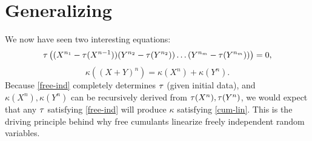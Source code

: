 \section{Generalizing}
We now have seen two interesting equations:
\begin{equation}
    \label{free-ind}
    \tau\left( (X^{n_1} - \tau(X^{n-1})) (Y^{n_2} - \tau(Y^{n_2}))\dots (Y^{n_m} - \tau(Y^{n_m})) \right) = 0,
\end{equation}
\begin{equation}
    \label{cum-lin}
    \kappa\left( (X+Y)^n \right) = \kappa(X^n) + \kappa(Y^n).
\end{equation}
Because \ref{free-ind} completely determines $\tau$ (given initial data), and $\kappa(X^n), \kappa(Y^n)$ can be recursively derived from $\tau(X^n), \tau(Y^n)$, we would expect that any $\tau$ satisfying \ref{free-ind} will produce $\kappa$ satisfying \ref{cum-lin}. This is the driving principle behind why free cumulants linearize freely independent random variables.


